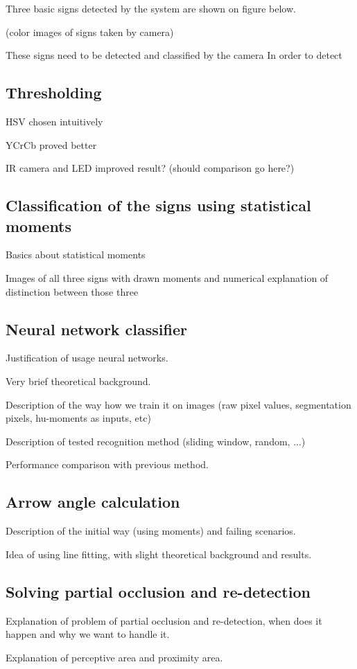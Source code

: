 
Three basic signs detected by the system are shown on figure below.

(color images of signs taken by camera)

These signs need to be detected and classified by the camera In order to detect

\subsection{Thresholding}

HSV chosen intuitively

YCrCb proved better

IR camera and LED improved result? (should comparison go here?)

\subsection{Classification of the signs using statistical moments}

Basics about statistical moments

Images of all three signs with drawn moments and numerical explanation of distinction between those three

\subsection{Neural network classifier}

Justification of usage neural networks.

Very brief theoretical background.

Description of the way how we train it on images (raw pixel values, segmentation pixels, hu-moments as inputs, etc)

Description of tested recognition method (sliding window, random, ...)

Performance comparison with previous method.

\subsection{Arrow angle calculation}

Description of the initial way (using moments) and failing scenarios. 

Idea of using line fitting, with slight theoretical background and results.

\subsection{Solving partial occlusion and re-detection}

Explanation of problem of partial occlusion and re-detection, when does it happen and why we want to handle it.

Explanation of perceptive area and proximity area.



